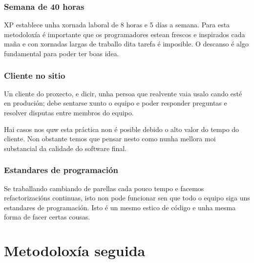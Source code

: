 \subsubsection{Semana de 40 horas}
XP establece unha xornada laboral de 8 horas e 5 días a semana. Para esta metodoloxía é importante que os programadores estean frescos e inspirados cada maña e con xornadas largas de traballo dita tarefa é imposible. O descanso é algo fundamental para poder ter boas idea.

\subsubsection{Cliente no sitio}
Un cliente do proxecto, e dicir, unha persoa que realvente vaia usalo cando esté en produción; debe sentarse xunto o equipo e poder responder preguntas e resolver disputas entre membros do equipo.

Hai casos nos quw esta práctica non é posible debido o alto valor do tempo do cliente. Non obstante temos que pensar nesto como nunha mellora moi substancial da calidade do software final.

\subsubsection{Estandares de programación}
Se traballando cambiando de parellas cada pouco tempo e facemos refactorizacións continuas, isto non pode funcionar sen que todo o equipo siga uns estandares de programación. Isto é un mesmo estico de código e unha mesma forma de facer certas cousas.

\section{Metodoloxía seguida}


